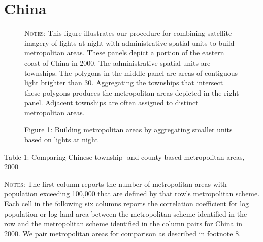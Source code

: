 \documentclass[11pt]{article}
\begin{document}
\section{China}

\begin{figure}
\caption*{Figure 1: Building metropolitan areas by aggregating smaller units based on
lights at night\label{fig:night-lights-procedure}}
\centering
{}
\begin{center}\begin{minipage}{0.95\textwidth}
{\footnotesize
	\textsc{Notes}:
	This figure illustrates our procedure for combining satellite imagery of lights at night with administrative spatial units to build metropolitan areas.
	These panels depict a portion of the eastern coast of China in 2000.
	The administrative spatial units are townships.
	The polygons in the middle panel are areas of contiguous light brighter than 30.
	Aggregating the townships that intersect these polygons produces the metropolitan areas depicted in the right panel.
	Adjacent townships are often assigned to distinct metropolitan areas.\par
}
\end{minipage}\end{center}
\end{figure}


\begin{table}
\caption*{Table 1: Comparing Chinese township- and county-based metropolitan areas, 2000\label{tab:China-county-vs-township-2000}}
\begin{centering}

\par\end{centering}
\centering{}%
\begin{minipage}[t]{0.9\textwidth}%
{\footnotesize \textsc{Notes}:
The first column reports the number of metropolitan areas with population exceeding 100,000 that are defined by that row's metropolitan scheme.
Each cell in the following six columns reports the correlation coefficient for log population or log land area
between the metropolitan scheme identified in the row and the metropolitan scheme identified
in the column pairs for China in 2000.
We pair metropolitan areas for comparison as described in footnote 8.
\par}
\end{minipage}
\end{table}
\end{document}
